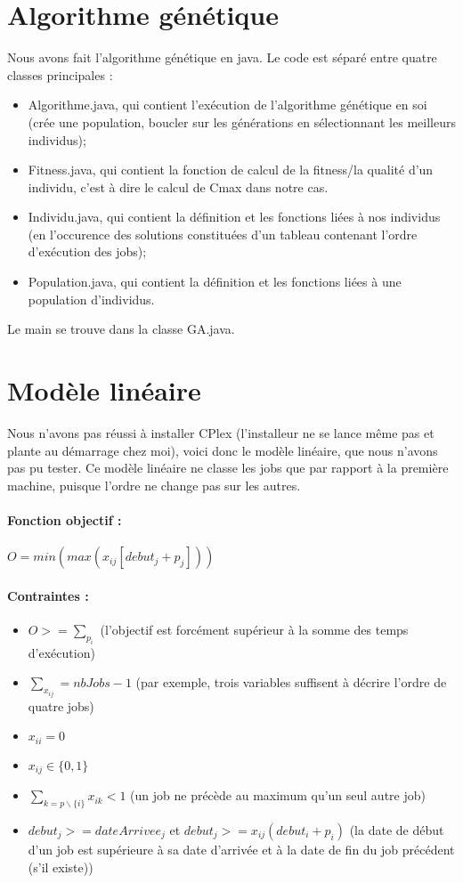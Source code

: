 \documentclass[11pt]{article} %
\begin{document}
\section{Algorithme génétique}
Nous avons fait l'algorithme génétique en java. Le code est séparé entre quatre classes principales : 
\begin{itemize}
	\item Algorithme.java, qui contient l'exécution de l'algorithme génétique en soi (crée une population, boucler sur les générations en sélectionnant les meilleurs individus);
	\item Fitness.java, qui contient la fonction de calcul de la fitness/la qualité d'un individu, c'est à dire le calcul de Cmax dans notre cas.
	\item Individu.java, qui contient la définition et les fonctions liées à nos individus (en l'occurence des solutions constituées d'un tableau contenant l'ordre d'exécution des jobs);
	\item Population.java, qui contient la définition et les fonctions liées à une population d'individus.\\
\end{itemize}

Le main se trouve dans la classe GA.java.

\section{Modèle linéaire}

Nous n'avons pas réussi à installer CPlex (l'installeur ne se lance même pas et plante au démarrage chez moi), voici donc le modèle linéaire, que nous n'avons pas pu tester.
Ce modèle linéaire ne classe les jobs que par rapport à la première machine, puisque l'ordre ne change pas sur les autres.\\

\paragraph{Fonction objectif :} $O = min(max(x_{ij}[debut_j+p_j]))$

\paragraph{Contraintes :}
\begin{itemize}
	\item $O >= \sum_{p_i}$ (l'objectif est forcément supérieur à la somme des temps d'exécution)
	\item $\sum_{x_{ij}} = nbJobs-1$ (par exemple, trois variables suffisent à décrire l'ordre de quatre jobs)
	\item $x_{ii} = 0$
	\item $x_{ij} \in \{0, 1\}$
	\item $\sum_{k=p\backslash\{i\}} x_{ik} < 1$ (un job ne précède au maximum qu'un seul autre job)
	\item $debut_j >= dateArrivee_j$ et $debut_j >= x_{ij}(debut_i+p_i)$ (la date de début d'un job est supérieure à sa date d'arrivée et à la date de fin du job précédent (s'il existe))
\end{itemize}
\end{document}
